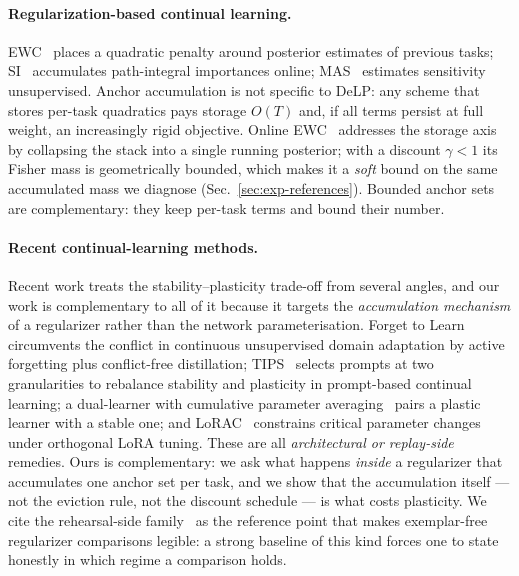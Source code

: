 \documentclass[review,12pt,number]{elsarticle}
\newcommand{\delp}{DeLP}
\begin{document}
\begin{sloppypar}
\paragraph{Regularization-based continual learning.}
EWC~\cite{kirkpatrick2017} places a quadratic penalty around posterior
estimates of previous tasks; SI~\cite{zenke2017} accumulates
path-integral importances online; MAS~\cite{aljundi2018} estimates
sensitivity unsupervised. Anchor accumulation is not specific to
\delp{}: any scheme that stores per-task quadratics pays storage
$O(T)$ and, if all terms persist at full weight, an increasingly
rigid objective. Online EWC~\cite{chaudhry2018} addresses the storage
axis by collapsing the stack into a single running posterior; with a
discount $\gamma{<}1$ its Fisher mass is geometrically bounded, which
makes it a \emph{soft} bound on the same accumulated mass we diagnose
(Sec.~\ref{sec:exp-references}). Bounded anchor sets are complementary:
they keep per-task terms and bound their number.

\paragraph{Recent continual-learning methods.}
Recent work treats the
stability--plasticity trade-off from several angles, and our work is
complementary to all of it because it targets the \emph{accumulation
mechanism} of a regularizer rather than the network parameterisation.
Forget to Learn~\cite{hassan2025f2l} circumvents the conflict in
continuous unsupervised domain adaptation by active forgetting plus
conflict-free distillation; {TIPS}~\cite{feng2026tips} selects prompts at
two granularities to rebalance stability and plasticity in prompt-based
continual learning; a dual-learner with cumulative parameter
averaging~\cite{sun2026dlcpa} pairs a plastic learner with a stable one;
and {LoRAC}~\cite{ling2026lorac} constrains critical parameter changes
under orthogonal {LoRA} tuning. These are all \emph{architectural or
replay-side} remedies. Ours is complementary: we ask what happens
\emph{inside} a regularizer that accumulates one anchor set per task,
and we show that the accumulation itself --- not the eviction rule,
not the discount schedule --- is what costs plasticity. We cite the
rehearsal-side family~\cite{buzzega2020der} as the reference point that
makes exemplar-free regularizer comparisons legible: a strong baseline
of this kind forces one to state honestly in which regime a comparison
holds.
\end{sloppypar}
\end{document}
